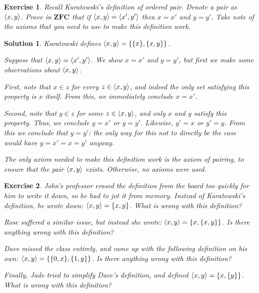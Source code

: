 \documentclass{article}
\newtheorem{ex}{Exercise}
\theoremstyle{nonumberplain}
\newtheorem{sol}{Solution}
\DeclarePairedDelimiter{\braket}{\langle}{\rangle}
\newcommand{\ZFC}{\mathbf{ZFC}}
\begin{document}
\begin{ex}
Recall Kuratowski's definition of ordered pair. Denote a pair as $\braket{x,y}$. Prove in $\ZFC$ that if $\braket{x,y} = \braket{x',y'}$ then $x = x'$ and $y = y'$. Take note of the axioms that you need to use to make this definition work.
\end{ex}

\begin{sol}
Kuratowski defines $\braket{x,y} = \{\{x\},\{x,y\}\}$.

Suppose that $\braket{x,y} = \braket{x',y'}$. We show $x = x'$ and $y = y'$, but first we make some observations about $\braket{x,y}$.

First, note that $x \in z$ for every $z \in \braket{x,y}$, and indeed the only set satisfying this property is $x$ itself. From this, we immediately conclude $x = x'$.

Second, note that $y \in z$ for \emph{some} $z \in \braket{x,y}$, and only $x$ and $y$ satisfy this property. Thus, we conclude $y = x'$ or $y = y'$. Likewise, $y' = x$ or $y' = y$. From this we conclude that $y = y'$: the only way for this not to directly be the case would have $y = x' = x = y'$ anyway.

The only axiom needed to make this definition work is the axiom of pairing, to ensure that the pair $\braket{x,y}$ exists. Otherwise, no axioms were used.
\end{sol}

\begin{ex}
John's professor erased the definition from the board too quickly for him to write it down, so he had to jot it from memory. Instead of Kuratowski's definition, he wrote down: $\braket{x,y} = \{x,y\}$. What is wrong with this definition?

Rose suffered a similar issue, but instead she wrote: $\braket{x,y} = \{x, \{x,y\}\}$. Is there anything wrong with this definition?

Dave missed the class entirely, and came up with the following definition on his own: $\braket{x,y} = \{\{0, x\}, \{1, y\}\}$. Is there anything wrong with this definition?

Finally, Jade tried to simplify Dave's definition, and defined $\braket{x,y} = \{x, \{y\}\}$. What is wrong with this definition?
\end{ex}
\end{document}
